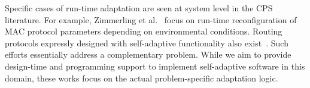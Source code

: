 Specific cases of run-time adaptation are seen at system level in the
CPS literature. For example, Zimmerling et al.~\cite{zimmerling12}
focus on run-time reconfiguration of MAC protocol parameters depending
on environmental conditions. Routing protocols expressly designed with
self-adaptive functionality also exist~\cite{Bourdenas11}. Such
efforts essentially address a complementary problem. While we aim to
provide design-time and programming support to implement self-adaptive
software in this domain, these works focus on the actual
problem-specific adaptation logic.




